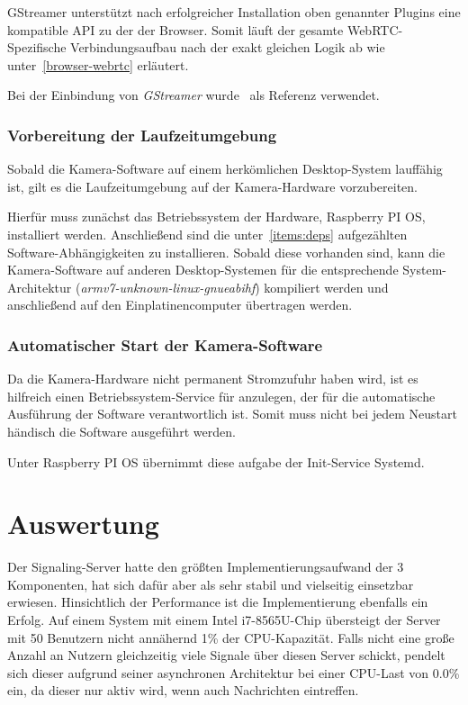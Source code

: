 \documentclass{article}
\begin{document}
\begin{onecolumn}
GStreamer unterstützt nach erfolgreicher Installation oben genannter Plugins
eine kompatible API zu der der Browser. Somit läuft der gesamte
WebRTC-Spezifische Verbindungsaufbau nach der exakt gleichen Logik ab wie
unter\ \ref{browser-webrtc} erläutert.

Bei der Einbindung von \textit{GStreamer} wurde~\cite{GStreamerExamples} als
Referenz verwendet.

\subsubsection{Vorbereitung der Laufzeitumgebung}

Sobald die Kamera-Software auf einem herkömlichen Desktop-System lauffähig ist,
gilt es die Laufzeitumgebung auf der Kamera-Hardware vorzubereiten.

Hierfür muss zunächst das Betriebssystem der Hardware, Raspberry PI OS,
installiert werden. Anschließend sind die unter~\ref{items:deps} aufgezählten
Software-Abhängigkeiten zu installieren. Sobald diese vorhanden sind, kann die
Kamera-Software auf anderen Desktop-Systemen für die entsprechende
System-Architektur (\textit{armv7-unknown-linux-gnueabihf}) kompiliert werden
und anschließend auf den Einplatinencomputer übertragen werden.

\subsubsection{Automatischer Start der Kamera-Software}

Da die Kamera-Hardware nicht permanent Stromzufuhr haben wird, ist es hilfreich
einen Betriebssystem-Service für anzulegen, der für die automatische Ausführung
der Software verantwortlich ist. Somit muss nicht bei jedem Neustart händisch
die Software ausgeführt werden.

Unter Raspberry PI OS übernimmt diese aufgabe der Init-Service Systemd.


\section{Auswertung}

Der Signaling-Server hatte den größten Implementierungsaufwand der 3
Komponenten, hat sich dafür aber als sehr stabil und vielseitig einsetzbar
erwiesen. Hinsichtlich der Performance ist die Implementierung ebenfalls ein
Erfolg. Auf einem System mit einem Intel i7-8565U-Chip übersteigt der Server
mit 50 Benutzern nicht annähernd 1\% der CPU-Kapazität. Falls nicht eine
große Anzahl an Nutzern gleichzeitig viele Signale über diesen Server schickt,
pendelt sich dieser aufgrund seiner asynchronen Architektur bei einer
CPU-Last von 0.0\% ein, da dieser nur aktiv wird, wenn auch Nachrichten
eintreffen.


\end{onecolumn}
\end{document}
